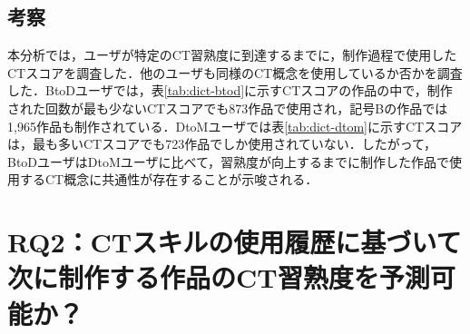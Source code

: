 \documentclass[submit]{ipsj}
\begin{document}
\vspace{-2mm}
\subsection{考察}
本分析では，ユーザが特定のCT習熟度に到達するまでに，制作過程で使用したCTスコアを調査した．他のユーザも同様のCT概念を使用しているか否かを調査した．BtoDユーザでは，表\ref{tab:dict-btod}に示すCTスコアの作品の中で，制作された回数が最も少ないCTスコアでも873作品で使用され，記号Bの作品では1,965作品も制作されている．DtoMユーザでは表\ref{tab:dict-dtom}に示すCTスコアは，最も多いCTスコアでも723作品でしか使用されていない．したがって，BtoDユーザはDtoMユーザに比べて，習熟度が向上するまでに制作した作品で使用するCT概念に共通性が存在することが示唆される．





\section{RQ2：CTスキルの使用履歴に基づいて次に制作する作品のCT習熟度を予測可能か？}
\label{sec:rq2}
\end{document}
